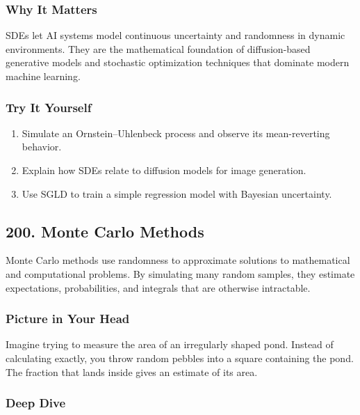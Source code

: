 \documentclass[
  letterpaper,
  DIV=11,
  numbers=noendperiod]{scrreprt}
\providecommand{\tightlist}{%
  \setlength{\itemsep}{0pt}\setlength{\parskip}{0pt}}
\begin{document}
\subsubsection{Why It Matters}\label{why-it-matters-96}

SDEs let AI systems model continuous uncertainty and randomness in
dynamic environments. They are the mathematical foundation of
diffusion-based generative models and stochastic optimization techniques
that dominate modern machine learning.

\subsubsection{Try It Yourself}\label{try-it-yourself-198}

\begin{enumerate}
\def\labelenumi{\arabic{enumi}.}
\tightlist
\item
  Simulate an Ornstein--Uhlenbeck process and observe its mean-reverting
  behavior.
\item
  Explain how SDEs relate to diffusion models for image generation.
\item
  Use SGLD to train a simple regression model with Bayesian uncertainty.
\end{enumerate}

\subsection{200. Monte Carlo Methods}\label{monte-carlo-methods-1}

Monte Carlo methods use randomness to approximate solutions to
mathematical and computational problems. By simulating many random
samples, they estimate expectations, probabilities, and integrals that
are otherwise intractable.

\subsubsection{Picture in Your Head}\label{picture-in-your-head-199}

Imagine trying to measure the area of an irregularly shaped pond.
Instead of calculating exactly, you throw random pebbles into a square
containing the pond. The fraction that lands inside gives an estimate of
its area.

\subsubsection{Deep Dive}\label{deep-dive-199}
\end{document}
